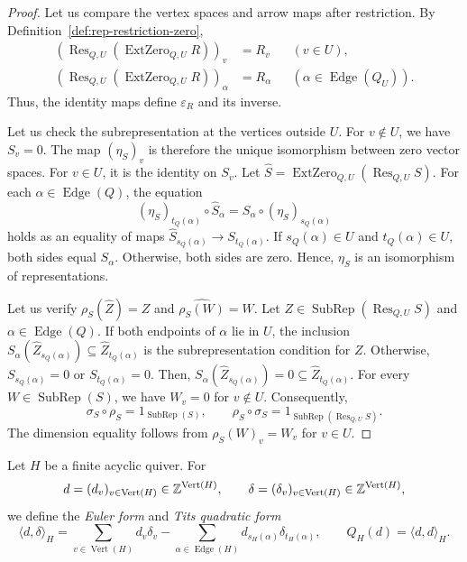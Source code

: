 \begin{proof}
 Let us compare the vertex spaces and arrow maps after restriction.
By Definition~\ref{def:rep-restriction-zero},
\[
\begin{aligned}
 (\operatorname{Res}_{Q,U}(\operatorname{ExtZero}_{Q,U}R))_v&=R_v
 &&(v\in U),\\
 (\operatorname{Res}_{Q,U}(\operatorname{ExtZero}_{Q,U}R))_\alpha&=R_\alpha
 &&(\alpha\in\operatorname{Edge}(Q_U)).
\end{aligned}
\]
Thus, the identity maps define $\varepsilon_R$ and its inverse.

 Let us check the subrepresentation at the vertices outside $U$.
For $v\notin U$, we have $S_v=0$.
The map $(\eta_S)_v$ is therefore the unique isomorphism between zero vector spaces.
For $v\in U$, it is the identity on $S_v$.
Let $\widehat S=\operatorname{ExtZero}_{Q,U}(\operatorname{Res}_{Q,U}S)$.
For each $\alpha\in\operatorname{Edge}(Q)$, the equation
\[
 (\eta_S)_{t_Q(\alpha)}\circ\widehat S_\alpha
 =S_\alpha\circ(\eta_S)_{s_Q(\alpha)}
\]
holds as an equality of maps $\widehat S_{s_Q(\alpha)}\to S_{t_Q(\alpha)}$.
If $s_Q(\alpha)\in U$ and $t_Q(\alpha)\in U$, both sides equal $S_\alpha$. Otherwise, both sides are zero.
Hence, $\eta_S$ is an isomorphism of representations.

 Let us verify $\rho_S(\widehat Z)=Z$ and $\widehat{\rho_S(W)}=W$.
Let $Z\in\operatorname{SubRep}(\operatorname{Res}_{Q,U}S)$ and $\alpha\in\operatorname{Edge}(Q)$.
If both endpoints of $\alpha$ lie in $U$, the inclusion
$S_\alpha(\widehat Z_{s_Q(\alpha)})\subseteq\widehat Z_{t_Q(\alpha)}$
is the subrepresentation condition for $Z$.
Otherwise, $S_{s_Q(\alpha)}=0$ or $S_{t_Q(\alpha)}=0$.
Then, $S_\alpha(\widehat Z_{s_Q(\alpha)})=0\subseteq\widehat Z_{t_Q(\alpha)}$.
For every $W\in\operatorname{SubRep}(S)$, we have $W_v=0$ for $v\notin U$.
Consequently,
\[
 \sigma_S\circ\rho_S=1_{\operatorname{SubRep}(S)},\qquad
 \rho_S\circ\sigma_S=1_{\operatorname{SubRep}(\operatorname{Res}_{Q,U}S)}.
\]
The dimension equality follows from $\rho_S(W)_v=W_v$ for $v\in U$.
\end{proof}

\begin{definition}\label{def:euler-tits-forms}
Let $H$ be a finite acyclic quiver. For
\[
 d=(d_v)_{v\in\operatorname{Vert}(H)}\in\mathbb Z^{\operatorname{Vert}(H)},\qquad
 \delta=(\delta_v)_{v\in\operatorname{Vert}(H)}\in\mathbb Z^{\operatorname{Vert}(H)},
\]
we define the \textit{Euler form} and \textit{Tits quadratic form}
\[
\langle d,\delta\rangle_H=\sum_{v\in\operatorname{Vert}(H)}d_v\delta_v
 -\sum_{\alpha\in\operatorname{Edge}(H)}d_{s_H(\alpha)}\delta_{t_H(\alpha)},\qquad Q_H(d)=\langle d,d\rangle_H.
\]
\end{definition}

